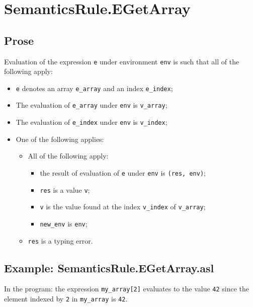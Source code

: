 \documentclass{book}
\begin{document}
\section{SemanticsRule.EGetArray \label{sec:SemanticsRule.EGetArray}}

  \subsection{Prose}

  Evaluation of the expression \texttt{e} under environment \texttt{env} is
  such that all of the following apply:
  \begin{itemize}
  \item \texttt{e} denotes an array \texttt{e\_array} and an index \texttt{e\_index};
  \item The evaluation of \texttt{e\_array} under \texttt{env} is \texttt{v\_array};
  \item The evaluation of \texttt{e\_index} under \texttt{env} is \texttt{v\_index};
  \item One of the following applies:
        \begin{itemize}
        \item All of the following apply:
          \begin{itemize}
          \item the result of evaluation of \texttt{e} under \texttt{env} is \texttt{(res, env)};
          \item \texttt{res} is a value \texttt{v};
          \item \texttt{v} is the value found at the index \texttt{v\_index} of \texttt{v\_array};
          \item \texttt{new\_env} is \texttt{env};
          \end{itemize}

        \item \texttt{res} is a typing error.
        \end{itemize}
  \end{itemize}

  \subsection{Example: SemanticsRule.EGetArray.asl}
    In the program:
    the expression \texttt{my\_array[2]} evaluates to the value \texttt{42} since the element
    indexed by \texttt{2} in \texttt{my\_array} is \texttt{42}.
\end{document}
